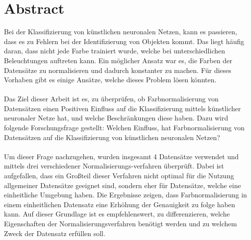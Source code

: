 \chapter*{Abstract}
Bei der Klassifizierung von künstlichen neuronalen Netzen, kann es passieren, dass es zu Fehlern bei der Identifizierung von Objekten kommt. Das liegt häufig daran, dass nicht jede Farbe trainiert wurde, welche bei unterschiedlichen Beleuchtungen auftreten kann. Ein möglicher Ansatz war es, die Farben der Datensätze zu normalisieren und dadurch konstanter zu machen. Für dieses Vorhaben gibt es einige Ansätze, welche dieses Problem lösen könnten.\\\\
Das Ziel dieser Arbeit ist es, zu überprüfen, ob Farbnormalisierung von Datensätzen einen Positiven Einfluss auf die Klassifizierung mittels künstlicher neuronaler Netze hat, und welche Beschränkungen diese haben. Dazu wird folgende Forschungsfrage gestellt: Welchen Einfluss, hat Farbnormalisierung von Datensätzen auf die Klassifizierung von künstlichen neuronalen Netzen? \\\\
Um dieser Frage nachzugehen, wurden insgesamt 4 Datensätze verwendet und mittels drei verschiedener Normalisierungs-verfahren überprüft. Dabei ist aufgefallen, dass ein Großteil dieser Verfahren nicht optimal für die Nutzung allgemeiner Datensätze geeignet sind, sondern eher für Datensätze, welche eine einheitliche Umgebung haben. Die Ergebnisse zeigen, dass Farbnormalisierung in einem einheitlichen Datensatz eine Erhöhung der Genauigkeit zu folge haben kann. Auf dieser Grundlage ist es empfehlenswert, zu differenzieren, welche Eigenschaften der Normalisierungsverfahren benötigt werden und zu welchem Zweck der Datensatz erfüllen soll.

